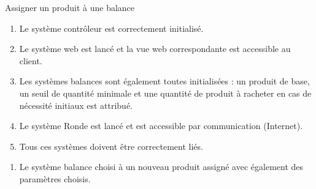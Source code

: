 \begin{UseCase}{Assigner un produit à une balance}


    \begin{UseCasePre}
        \begin{enumerate}
            \item Le système contrôleur est correctement initialisé.
            \item Le système web est lancé et la vue web correspondante est
                accessible au client.
            \item Les systèmes balances sont également toutes initialisées : un
                produit de base,  un seuil de quantité minimale et une quantité de
                produit à racheter en cas de nécessité initiaux est attribué.
            \item Le système Ronde est lancé et est accessible par communication
                (Internet).
            \item Tous ces systèmes doivent être correctement liés.
        \end{enumerate}
    \end{UseCasePre}

    \begin{UseCasePost}
        \begin{enumerate}
            \item Le système balance choisi à un nouveau produit assigné avec également
                des paramètres choisis.
        \end{enumerate}
    \end{UseCasePost}


\end{UseCase}
